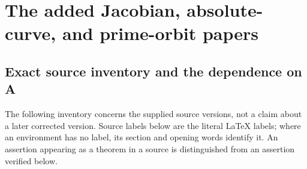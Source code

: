 \section{The added Jacobian, absolute-curve, and prime-orbit papers}
\label{sec:sites-followup}

\subsection{Exact source inventory and the dependence on A}

The following inventory concerns the supplied source versions, not a
claim about a later corrected version.  Source labels below are the
literal LaTeX labels; where an environment has no label, its section and
opening words identify it.  An assertion appearing as a theorem in a
source is distinguished from an assertion verified below.
